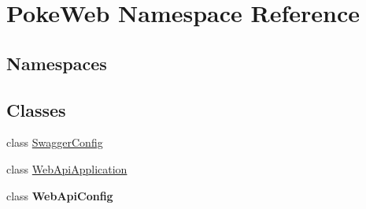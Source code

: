 \hypertarget{namespace_poke_web}{}\section{Poke\+Web Namespace Reference}
\label{namespace_poke_web}
\subsection*{Namespaces}
\begin{DoxyCompactItemize}
\end{DoxyCompactItemize}
\subsection*{Classes}
\begin{DoxyCompactItemize}
\item 
class \mbox{\hyperlink{class_poke_web_1_1_swagger_config}{Swagger\+Config}}
\item 
class \mbox{\hyperlink{class_poke_web_1_1_web_api_application}{Web\+Api\+Application}}
\item 
class {\bfseries Web\+Api\+Config}
\end{DoxyCompactItemize}
